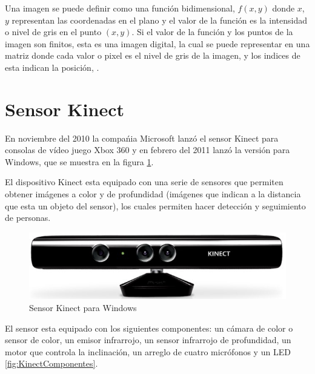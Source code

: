 Una imagen se puede definir como una función bidimensional, $f(x,y)$ donde $x$, $y$ representan las coordenadas en el plano y el valor de la función es la intensidad o nivel de gris en el punto $(x,y)$. 
Si el valor de la función y los puntos de la imagen son finitos, esta es una imagen digital, la cual se puede representar en una matriz donde cada valor o pixel es el nivel de gris de la imagen, y los indices de esta indican la posición, \citep{Gonzalez2002}.


\section{Sensor Kinect}\label{KinectSensor} 

En noviembre del 2010 la compa\'nia Microsoft lanz\'o el sensor Kinect para consolas de vídeo juego Xbox 360 y en febrero del 2011 lanz\'o la versi\'on para Windows, que se muestra en la figura \ref{fig:KinectPic}.  

El dispositivo Kinect esta equipado con una serie de sensores que permiten obtener imágenes a color y de profundidad (imágenes que indican a la distancia que esta un objeto del sensor), los cuales permiten hacer detección y seguimiento de personas.    
  
\begin{figure}[!h]
\begin{center}
\includegraphics[scale=.6]{./Figures/Kinect.jpg}
\end{center}
\caption{Sensor Kinect para Windows}
\label{fig:KinectPic}
\end{figure} 

El sensor esta equipado con los siguientes componentes: un cámara de color o sensor de color, un emisor infrarrojo, un sensor infrarrojo de profundidad, un motor que controla la inclinación, un arreglo de cuatro micrófonos y un LED \ref{fig:KinectComponentes}. 

